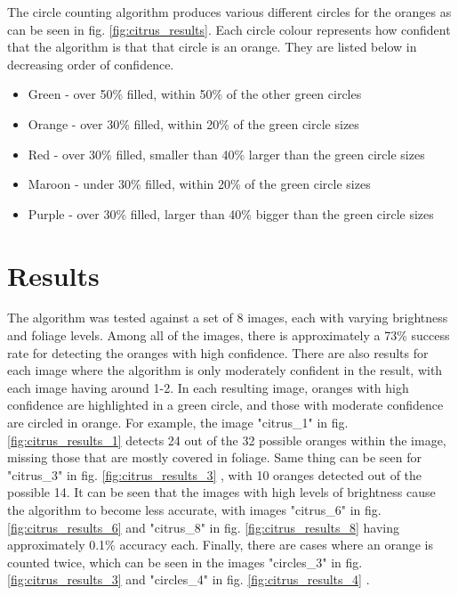 \documentclass[conference]{IEEEtran}
\begin{document}
The circle counting algorithm produces various different circles for the oranges as can be seen in fig. \ref{fig:citrus_results}. Each circle colour represents how confident that the algorithm is that that circle is an orange. They are listed below in decreasing order of confidence.

\begin{itemize}
\item Green - over 50\% filled, within 50\% of the other green circles
\item Orange - over 30\% filled, within 20\% of the green circle sizes
\item Red - over 30\% filled, smaller than 40\% larger than the green circle sizes
\item Maroon - under 30\% filled,  within 20\% of the green circle sizes
\item Purple - over 30\% filled, larger  than 40\% bigger than the green circle sizes
\end{itemize}


\section{Results}

The algorithm was tested against a set of 8 images, each with varying brightness and foliage levels. Among all of the images, there is approximately a 73\% success rate for detecting the oranges with high confidence. There are also results for each image where the algorithm is only moderately confident in the result, with each image having around 1-2. In each resulting image, oranges with high confidence are highlighted in a green circle, and those with moderate confidence are circled in orange. For example, the image "citrus\_1" in fig. \ref{fig:citrus_results_1} detects 24 out of the 32 possible oranges within the image, missing those that are mostly covered in foliage. Same thing can be seen for "citrus\_3" in fig. \ref{fig:citrus_results_3} , with 10 oranges detected out of the possible 14. It can be seen that the images with high levels of brightness cause the algorithm to become less accurate, with images "citrus\_6"  in fig.\ref{fig:citrus_results_6} and "citrus\_8" in fig. \ref{fig:citrus_results_8}  having approximately 0.1\% accuracy each. Finally, there are cases where an orange is counted twice, which can be seen in the images "circles\_3" in fig. \ref{fig:citrus_results_3} and "circles\_4" in fig. \ref{fig:citrus_results_4} .
\end{document}
